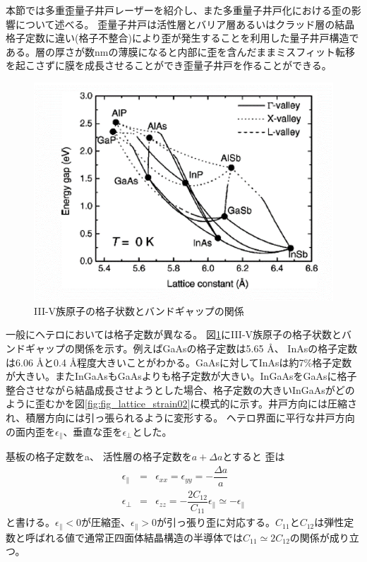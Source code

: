 本節では多重歪量子井戸レーザーを紹介し、また多重量子井戸化における歪の影響について述べる。
歪量子井戸は活性層とバリア層あるいはクラッド層の結晶格子定数に違い(格子不整合)により歪が発生することを利用した量子井戸構造である。層の厚さが数nmの薄膜になると内部に歪を含んだままミスフィット転移を起こさずに膜を成長させることができ歪量子井戸を作ることができる。
\begin{figure}[h]
	\centering
	\includegraphics[width=13cm]{figure/fig_1_1_lattice_constance.png}
	\caption[III-V族原子の格子状数とバンドギャップの関係]{III-V族原子の格子状数とバンドギャップの関係\cite{ref_band_para}}
	\label{fig:fig_1_1_lattice_constance}
\end{figure}

一般にヘテロにおいては格子定数が異なる。
図\ref{fig:fig_1_1_lattice_constance}にIII-V族原子の格子状数とバンドギャップの関係を示す\cite{ref_band_para}。例えばGaAsの格子定数は5.65 \AA 、 InAsの格子定数は6.06 \AA と0.4 \AA 程度大きいことがわかる。GaAsに対してInAsは約7\%格子定数が大きい。またInGaAsもGaAsよりも格子定数が大きい。InGaAsをGaAsに格子整合させながら結晶成長させようとした場合、格子定数の大きいInGaAsがどのように歪むかを図\ref{fig:fig_lattice_strain02}に模式的に示す。井戸方向には圧縮され、積層方向には引っ張られるように変形する。
ヘテロ界面に平行な井戸方向の面内歪を$\epsilon_{\|}$、垂直な歪を$\epsilon_{\bot}$とした。

基板の格子定数をa、 活性層の格子定数を$a+\Delta a$とすると
歪は
\begin{eqnarray}
\epsilon_{\|}&=&\epsilon_{xx}=\epsilon_{yy}=-\dfrac{\Delta a}{a}\\
\epsilon_{\bot}&=&\epsilon_{zz}=-\dfrac{2C_{12}}{C_{11}}\epsilon_{\|}\simeq -\epsilon_{\|}
\end{eqnarray}
と書ける。$\epsilon_{\|}<0$が圧縮歪、$\epsilon_{\|}>0$が引っ張り歪に対応する。$C_{11}$と$C_{12}$は弾性定数と呼ばれる値で通常正四面体結晶構造の半導体では$C_{11}\simeq 2C_{12}$の関係が成り立つ\cite{ref_iga}。


